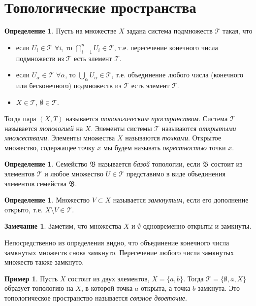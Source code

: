 \documentclass[12pt, titlepage, oneside]{amsbook}
\newcommand{\TTT}{{\mathcal T}}
\newcommand{\BBB}{\mathfrak{B}}
\theoremstyle{definition}
\newtheorem{example}[theorem]{Пример}
\newtheorem{definition}[theorem]{Определение}
\newtheorem{remark}[theorem]{Замечание}
\theoremstyle{remark}
\begin{document}
\section{Топологические пространства}

\begin{definition}
	Пусть на множестве $X$ задана система подмножеств $\TTT$ такая, что
	\begin{itemize}
		\item если $U_i\in\TTT$ $\forall i$, то $\bigcap\limits_{i=1}^n U_i\in\TTT$, т.е. пересечение конечного числа подмножеств из $\TTT$ есть элемент $\TTT$.
		\item если $U_\alpha\in\TTT$ $\forall \alpha$, то $\bigcup\limits_{\alpha} U_\alpha\in\TTT$, т.е. объединение любого числа (конечного или бесконечного) подмножеств из $\TTT$ есть элемент $\TTT$.
		\item $X\in\TTT$, $\emptyset\in\TTT$.
	\end{itemize}
	Тогда пара $(X,T)$ называется \emph{топологическим пространством}. Система $\TTT$ называется \emph{топологией} на $X$. Элементы системы $\TTT$ называются \emph{открытыми множествами}. Элементы множества $X$ называются \emph{точками}. Открытое множество, содержащее точку $x$ мы будем называть \emph{окрестностью} точки $x$.
\end{definition}

\begin{definition}
	Семейство $\BBB$ называется \emph{базой} топологии, если $\BBB$ состоит из элементов $\TTT$ и любое множество $U\in\TTT$ представимо в виде объединения элементов семейства $\BBB$.
\end{definition}

\begin{definition}
	Множество $V\subset X$ называется \emph{замкнутым}, если его дополнение открыто, т.е. $X\setminus V\in\TTT$.
\end{definition}

\begin{remark}
	Заметим, что множества $X$ и $\emptyset$ одновременно открыты и замкнуты.
\end{remark}

Непосредственно из определения видно, что объединение конечного числа замкнутых множеств снова замкнуто. Пересечение любого числа замкнутых множеств также замкнуто.

\begin{example}
	Пусть $X$ состоит из двух элементов, $X=\{a,b\}$. Тогда $\TTT=\{\emptyset,a,X\}$ образует топологию на $X$, в которой точка $a$ открыта, а точка $b$ замкнута. Это топологическое пространство называется \emph{связное двоеточие}.
\end{example}
\end{document}
